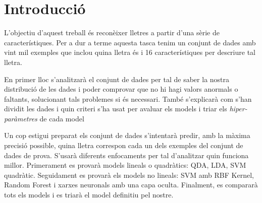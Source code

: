 \section{Introducció}
L'objectiu d'aquest treball és reconèixer lletres a partir d'una sèrie de característiques. Per a dur a terme aquesta tasca tenim un conjunt de dades\cite{datasetLetter} amb vint mil exemples que inclou quina lletra és i 16 característiques per descriure tal lletra.

En primer lloc s'analitzarà el conjunt de dades per tal de saber la nostra distribució de les dades i poder comprovar que no hi hagi valors anormals o faltants, solucionant tals problemes si és necessari. També s'explicarà com s'han dividit les dades i quin criteri s'ha usat per avaluar els models i triar els \textit{hiper-paràmetres} de cada model

Un cop estigui preparat els conjunt de dades s'intentarà predir, amb la màxima precisió possible, quina lletra correspon cada un dels exemples del conjunt de dades de prova. S'usarà diferents enfocaments per tal d'analitzar quin funciona millor. Primerament es provarà models lineals o quadràtics: QDA, LDA, SVM quadràtic. Seguidament es provarà els models no lineals: SVM amb RBF Kernel, Random Forest i xarxes neuronals amb una capa oculta. Finalment, es compararà tots els models i es triarà el model definitiu pel nostre.

